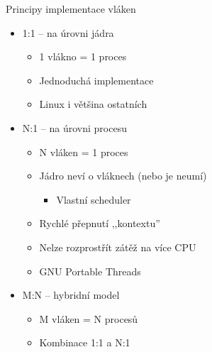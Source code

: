 \begin{frame}{Principy implementace vláken}

  \begin{itemize}
    \item 1:1 -- na úrovni jádra
    \begin{itemize}
      \item 1 vlákno = 1 proces
      \item Jednoduchá implementace
      \item Linux i většina ostatních
    \end{itemize}

    \pause

    \item N:1 -- na úrovni procesu
    \begin{itemize}
      \item N vláken = 1 proces
      \item Jádro neví o vláknech (nebo je neumí)
      \begin{itemize}
	\item Vlastní scheduler
      \end{itemize}
      \item Rychlé přepnutí ,,kontextu''
      \item Nelze rozprostřít zátěž na více CPU
      \item GNU Portable Threads
    \end{itemize}

    \pause

    \item M:N -- hybridní model
    \begin{itemize}
      \item M vláken = N procesů
      \item Kombinace 1:1 a N:1
    \end{itemize}
  \end{itemize}

\end{frame}



